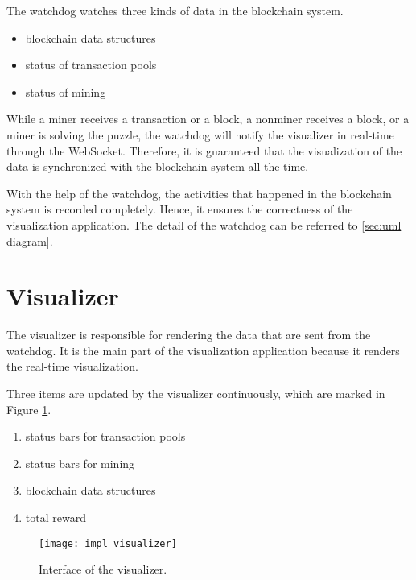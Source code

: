 The watchdog watches three kinds of data in the blockchain system.

\begin{itemize}
    \item blockchain data structures
    \item status of transaction pools
    \item status of mining
\end{itemize}

While a miner receives a transaction or a block, a nonminer receives a block, or a miner is solving the puzzle, the watchdog will notify the visualizer in real-time through the WebSocket. Therefore, it is guaranteed that the visualization of the data is synchronized with the blockchain system all the time.

With the help of the watchdog, the activities that happened in the blockchain system is recorded completely. Hence, it ensures the correctness of the visualization application. The detail of the watchdog can be referred to \ref{sec:uml diagram}.

\section{Visualizer}

The visualizer is responsible for rendering the data that are sent from the watchdog. It is the main part of the visualization application because it renders the real-time visualization. 

Three items are updated by the visualizer continuously, which are marked in Figure \ref{fig:interface of the visualizer}.

\begin{enumerate}
    \item status bars for transaction pools
    \item status bars for mining
    \item blockchain data structures
    \item total reward
\end{enumerate}

\begin{figure}[htb]
    \centering
    \texttt{[image: impl\_visualizer]}
    \caption{Interface of the visualizer.}
    \label{fig:interface of the visualizer}
\end{figure}

